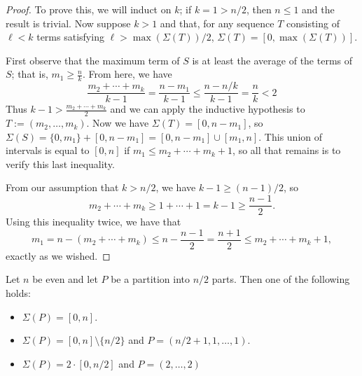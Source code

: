 \begin{proof}
To prove this, we will induct on $k$; if $k=1 > n/2$, then $n \le 1$ and the result is trivial.
Now suppose $k > 1$ and that, for any sequence $T$ consisting of $\ell < k$ terms satisfying $\ell > \max(\Sigma(T))/2$, $\Sigma(T) = [ 0, \max(\Sigma(T)) ]$.
	
First observe that the maximum term of $S$ is at least the average of the terms of $S$; that is, $m_1 \ge \frac{n}{k}$.
From here, we have
\[ \frac{m_2+\cdots + m_k}{k-1} = \frac{n-m_1}{k-1} \le \frac{n-n/k}{k-1} = \frac{n}{k} < 2 \]
Thus $k - 1 > \frac{m_2+\cdots+m_k}{2}$ and we can apply the inductive hypothesis to $T := (m_2,\dots, m_k)$.
Now we have $\Sigma(T) = [ 0, n-m_1 ]$, so $\Sigma(S) = \{0,m_1\} + [ 0,n-m_1 ] = [ 0,n-m_1 ] \cup [ m_1,n ]$.
This union of intervals is equal to $[ 0,n ]$ if $m_1 \le m_2 + \cdots + m_k +1$, so all that remains is to verify this last inequality.
	
From our assumption that $k > n/2$, we have $k-1 \ge (n-1)/2$, so 
\[m_2 + \cdots + m_k \ge 1 +\cdots + 1 = k-1 \ge \frac{n-1}{2}.\]
Using this inequality twice, we have that
\[m_1 = n - (m_2 + \cdots + m_k) \le n - \frac{n-1}{2} = \frac{n+1}{2} \le m_2 + \cdots + m_k + 1,\]
exactly as we wished.
\end{proof}

\begin{lemma} \label{lem:n/2-partitions}
Let $n$ be even and let $P$ be a partition into $n/2$ parts.
Then one of the following holds:
\begin{itemize}
	\item $\Sigma(P) = [ 0, n ]$.
	\item $\Sigma(P) = [ 0,n ]\setminus\{n/2\}$ and $P = (n/2+1,1,\dots,1)$.
	\item $\Sigma(P) = 2\cdot [ 0, n/2 ]$ and $P = (2,\dots, 2)$
\end{itemize}
\end{lemma}

